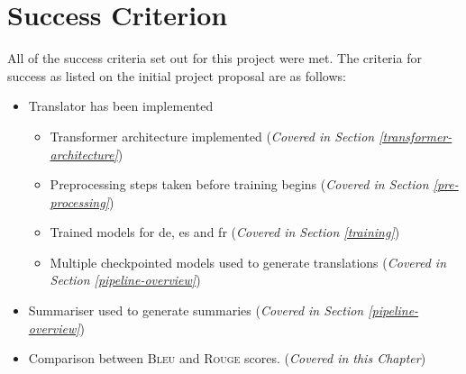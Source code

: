 \documentclass[12pt,a4paper,twoside,openright]{report}
\newcommand{\bleu}{\textsc{Bleu} }
\newcommand{\rouge}{\textsc{Rouge} }
\newcommand{\perftrans}{\textsc{Perf-Trans} }
\begin{document}
\section{Success Criterion}
All of the success criteria set out for this project were met. The criteria for success as listed on the initial project proposal are as follows:
\renewcommand{\labelitemi}{$\checkmark$}
\begin{itemize}
    \item Translator has been implemented
    \begin{itemize}
        \item Transformer architecture implemented (\textit{Covered in Section \ref{transformer-architecture}})
        \item Preprocessing steps taken before training begins (\textit{Covered in Section \ref{pre-processing}})
        \item Trained models for de, es and fr (\textit{Covered in Section \ref{training}})
        \item Multiple checkpointed models used to generate translations (\textit{Covered in Section \ref{pipeline-overview}})
    \end{itemize}
    \item Summariser used to generate summaries (\textit{Covered in Section \ref{pipeline-overview}})
    \item Comparison between \bleu and \rouge scores. (\textit{Covered in this Chapter})
\end{itemize}\renewcommand{\labelitemi}{$\bullet$}

\end{document}
